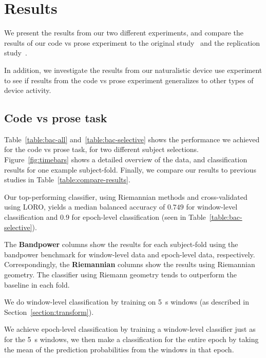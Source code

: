 \chapter{Results}\label{section:results}

    We present the results from our two different experiments, and compare the results of our code vs prose experiment to the original study~\cite{floyd_decoding_2017} and the replication study~\cite{fucci_replication_2019}. 

    In addition, we investigate the results from our naturalistic device use experiment to see if results from the code vs prose experiment generalizes to other types of device activity.

    \vfill
    \pagebreak
    \section{Code vs prose task}
        Table~\ref{table:bac-all} and~\ref{table:bac-selective} shows the performance we achieved for the code vs prose task, for two different subject selections. Figure~\ref{fig:timebars} shows a detailed overview of the data, and classification results for one example subject-fold. Finally, we compare our results to previous studies in Table~\ref{table:compare-results}.

        

        Our top-performing classifier, using Riemannian methods and cross-validated using LORO, yields a median balanced accuracy of $0.749$  for window-level classification and $0.9$ for epoch-level classification (seen in Table~\ref{table:bac-selective}).

        The \textbf{Bandpower} columns show the results for each subject-fold using the bandpower benchmark for window-level data and epoch-level data, respectively. Correspondingly, the \textbf{Riemannian} columns show the results using Riemannian geometry. The classifier using Riemann geometry tends to outperform the baseline in each fold.

        We do window-level classification by training on \SI{5}{\second} windows (as described in Section~\ref{section:transform}).

        We achieve epoch-level classification by training a window-level classifier just as for the \SI{5}{\second} windows, we then make a classification for the entire epoch by taking the mean of the prediction probabilities from the windows in that epoch.


